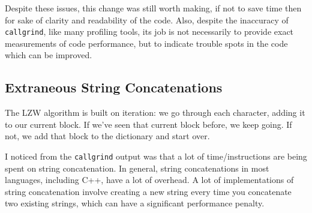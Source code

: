\documentclass[12pt,twoside]{reedthesis}
\begin{document}
Despite these issues, this change was still worth making, if not to save time then for sake of clarity and readability of the code. Also, despite the inaccuracy of \texttt{callgrind}, like many profiling tools, its job is not necessarily to provide exact measurements of code performance, but to indicate trouble spots in the code which can be improved.

\hypertarget{extraneous-string-concatenations}{%
\subsection{Extraneous String Concatenations}\label{extraneous-string-concatenations}}

The LZW algorithm is built on iteration: we go through each character, adding it to our current block. If we've seen that current block before, we keep going. If not, we add that block to the dictionary and start over.

I noticed from the \texttt{callgrind} output was that a lot of time/instructions are being spent on string concatenation. In general, string concatenations in most languages, including C++, have a lot of overhead. A lot of implementations of string concatenation involve creating a new string every time you concatenate two existing strings, which can have a significant performance penalty.
\end{document}
